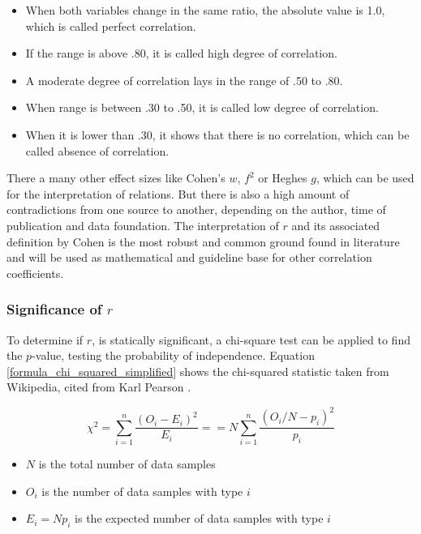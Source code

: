 \documentclass[a4paper,headsepline,footsepline,fontsize=11pt,BCOR=12mm,DIV=12]{report}
\begin{document}
\begin{itemize}
  \item When both variables change in the same ratio, the absolute value is 1.0, which is called perfect correlation.
  \item If the range is above .80, it is called high degree of correlation.
  \item A moderate degree of correlation lays in the range of .50 to .80.
  \item When range is between .30 to .50, it is called low degree of correlation.
  \item When it is lower than .30, it shows that there is no correlation, which can be called absence of correlation.
\end{itemize}	

There a many other effect sizes like Cohen's $w$, $f^2$ or Heghes $g$, which can be used for the interpretation of relations. But there is also a high amount of contradictions from one source to another, depending on the author, time of publication and data foundation. The interpretation of $r$ and its associated definition by Cohen is the most robust and common ground found in literature and will be used as mathematical and guideline base for other correlation coefficients.

\subsubsection{Significance of $r$}
To determine if $r$, is statically significant, a chi-square test can be applied to find the $p$-value, testing the probability of independence. Equation \ref{formula_chi_squared_simplified} shows the chi-squared statistic taken from Wikipedia, cited from Karl Pearson \cite{Pearson1990}.

\smallskip


\begin{equation}
\label{formula_chi_squared_simplified}	
	\chi^2 = \sum_{i=1}^{n}{\frac{(O_i-E_i)^2}{E_i}} == N\sum_{i=1}^{n}{\frac{(O_i/N-p_i)^2}{p_i}}
\end{equation}

\begin{itemize}
	\setlength\itemsep{0.1em}	
	\item[] $N$ is the total number of data samples 
	\item[] $O_i$ is the number of data samples with type $i$
	\item[] $E_i = N p_i$ is the expected number of data samples with type $i$
\end{itemize}
\end{document}
